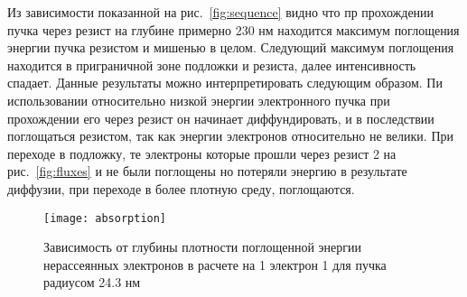 Из зависимости показанной на рис.~\ref{fig:sequence} видно что пр прохождении пучка через резист на глубине примерно 230 нм находится максимум поглощения энергии пучка резистом и мишенью в целом. Следующий максимум поглощения находится в приграничной зоне подложки и резиста, далее интенсивность спадает. Данные результаты можно интерпретировать следующим образом. Пи использовании относительно низкой энергии электронного пучка при прохождении его через резист он начинает диффундировать, и в последствии поглощаться резистом, так как энергии электронов относительно не велики. При переходе в подложку, те электроны которые прошли через резист 2 на рис.~\ref{fig:fluxes} и не были поглощены но потеряли энергию в результате диффузии, при переходе в более плотную среду, поглощаются.
\begin{figure}[h]
    \center
    \texttt{[image: absorption]}
    \caption{Зависимость от глубины плотности поглощенной энергии нерассеянных электронов в расчете на 1 электрон 1 для пучка радиусом 24.3 нм}
    \label{fig:absorption}
\end{figure}

